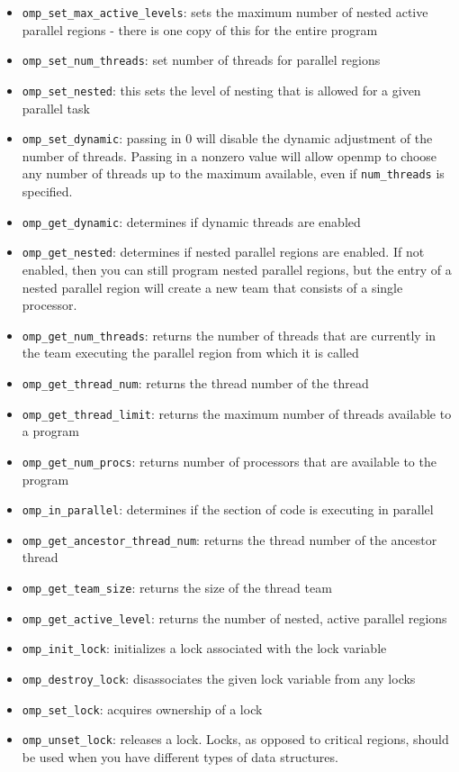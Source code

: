 \documentclass[10pt]{article}
\begin{document}
\begin{flushleft}
\begin{itemize}
\item {\tt omp\_set\_max\_active\_levels}: sets the maximum number of nested active parallel regions - there is one copy of this for the entire program
\item {\tt omp\_set\_num\_threads}: set number of threads for parallel regions
\item {\tt omp\_set\_nested}: this sets the level of nesting that is allowed for a given parallel task
\item {\tt omp\_set\_dynamic}: passing in 0 will disable the dynamic adjustment of the number of threads. Passing in a nonzero value will allow \gls{openmp} to choose any number of threads up to the maximum available, even if {\tt num\_threads} is specified.
\item {\tt omp\_get\_dynamic}: determines if dynamic threads are enabled
\item {\tt omp\_get\_nested}: determines if nested parallel regions are enabled. If not enabled, then you can still program nested parallel regions, but the entry of a nested parallel region will create a new team that consists of a single processor.
\item {\tt omp\_get\_num\_threads}: returns the number of threads that are currently in the team executing the parallel region from which it is called
\item {\tt omp\_get\_thread\_num}: returns the thread number of the thread
\item {\tt omp\_get\_thread\_limit}: returns the maximum number of threads available to a program
\item {\tt omp\_get\_num\_procs}: returns number of processors that are available to the program
\item {\tt omp\_in\_parallel}: determines if the section of code is executing in parallel
\item {\tt omp\_get\_ancestor\_thread\_num}: returns the thread number of the ancestor thread
\item {\tt omp\_get\_team\_size}: returns the size of the thread team
\item {\tt omp\_get\_active\_level}: returns the number of nested, active parallel regions 
\item {\tt omp\_init\_lock}: initializes a lock associated with the lock variable
\item {\tt omp\_destroy\_lock}: disassociates the given lock variable from any locks
\item {\tt omp\_set\_lock}: acquires ownership of a lock
\item {\tt omp\_unset\_lock}: releases a lock. Locks, as opposed to critical regions, should be used when you have different types of data structures.
\end{itemize}


\end{flushleft}
\end{document}
